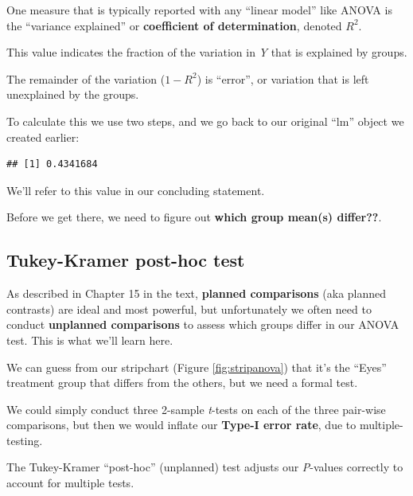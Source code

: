 \documentclass[
]{book}
\newenvironment{Shaded}{\begin{snugshade}}{\end{snugshade}}
\newcommand{\FunctionTok}[1]{\textcolor[rgb]{0.13,0.29,0.53}{\textbf{#1}}}
\newcommand{\NormalTok}[1]{#1}
\newcommand{\OtherTok}[1]{\textcolor[rgb]{0.56,0.35,0.01}{#1}}
\newcommand{\SpecialCharTok}[1]{\textcolor[rgb]{0.81,0.36,0.00}{\textbf{#1}}}
\begin{document}
One measure that is typically reported with any ``linear model'' like ANOVA is the ``variance explained'' or \textbf{coefficient of determination}, denoted \(R^2\).

This value indicates the fraction of the variation in \emph{Y} that is explained by groups.

The remainder of the variation (\(1 - R^2\)) is ``error'', or variation that is left unexplained by the groups.

To calculate this we use two steps, and we go back to our original ``lm'' object we created earlier:

\begin{Shaded}
\end{Shaded}

\begin{verbatim}
## [1] 0.4341684
\end{verbatim}

We'll refer to this value in our concluding statement.

Before we get there, we need to figure out \textbf{which group mean(s) differ??}.

\subsection{Tukey-Kramer post-hoc test}\label{tukey}

As described in Chapter 15 in the text, \textbf{planned comparisons} (aka planned contrasts) are ideal and most powerful, but unfortunately we often need to conduct \textbf{unplanned comparisons} to assess which groups differ in our ANOVA test. This is what we'll learn here.

We can guess from our stripchart (Figure \ref{fig:stripanova}) that it's the ``Eyes'' treatment group that differs from the others, but we need a formal test.

We could simply conduct three 2-sample \emph{t}-tests on each of the three pair-wise comparisons, but then we would inflate our \textbf{Type-I error rate}, due to multiple-testing.

The Tukey-Kramer ``post-hoc'' (unplanned) test adjusts our \emph{P}-values correctly to account for multiple tests.
\end{document}

